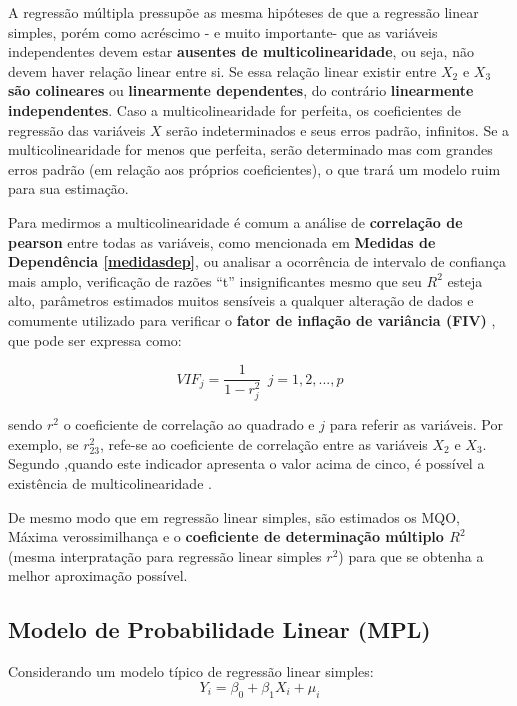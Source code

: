 \documentclass[
]{book}
\begin{document}
A regressão múltipla pressupõe as mesma hipóteses de que a regressão linear simples, porém como acréscimo - e muito importante- que as variáveis independentes devem estar \textbf{ausentes de multicolinearidade}, ou seja, não devem haver relação linear entre si. Se essa relação linear existir entre \(X_2\) e \(X_3\) \textbf{são colineares} ou \textbf{linearmente dependentes}, do contrário \textbf{linearmente independentes}. Caso a multicolinearidade for perfeita, os coeficientes de regressão das variáveis \(X\) serão indeterminados e seus erros padrão, infinitos. Se a multicolinearidade for menos que perfeita, serão determinado mas com grandes erros padrão (em relação aos próprios
coeficientes), o que trará um modelo ruim para sua estimação.

Para medirmos a multicolinearidade é comum a análise de \textbf{correlação de pearson} entre todas as variáveis, como mencionada em \textbf{Medidas de Dependência \ref{medidasdep}}, ou analisar a ocorrência de intervalo de confiança mais amplo, verificação de razões ``t'' insignificantes mesmo que seu \(R^2\) esteja alto, parâmetros estimados muitos sensíveis a qualquer alteração de dados e comumente utilizado para verificar o \textbf{fator de inflação de variância (FIV)} \citep{montgomery2012introduction}, que pode ser expressa como:

\begin{equation}
    VIF_j=\frac{1}{1-r^2_j} \ \ j=1,2,...,p
    \label{eq:vif}
\end{equation}

sendo \(r^2\) o coeficiente de correlação ao quadrado e \(j\) para referir as variáveis. Por exemplo, se \(r^2_{23}\), refe-se ao coeficiente de correlação entre as variáveis \(X_2\) e \(X_3\). Segundo ,quando este indicador apresenta o valor acima de cinco, é possível a existência de multicolinearidade \citep{maroco2014analise}.

De mesmo modo que em regressão linear simples, são estimados os MQO, Máxima verossimilhança e o \textbf{coeficiente de determinação múltiplo \(R^2\)} (mesma interpratação para regressão linear simples \(r^2\)) para que se obtenha a melhor aproximação possível.

\hypertarget{mpl}{%
\subsection{Modelo de Probabilidade Linear (MPL)}\label{mpl}}

Considerando um modelo típico de regressão linear simples:
\[Y_i=\beta_0+\beta_1 X_i+\mu_i \]
\end{document}
